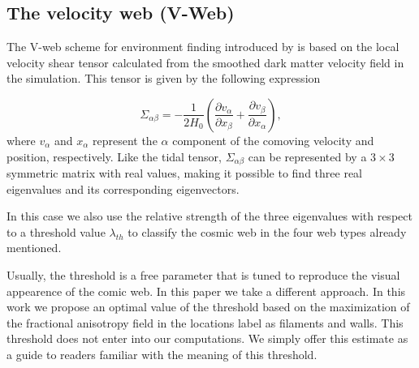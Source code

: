 \documentclass[a4,useAMS,usenatbib,usegraphicx]{mn2e}
\newcommand{\pr}[1]{ \left( #1 \right) }
\newcommand{\eq}[2]{\begin{equation} \label{eq:#1} #2 \end{equation}}
\begin{document}
\subsection{The velocity web (V-Web)}
\label{subsec:Vweb}

The V-web scheme for environment finding introduced by
\cite{Hoffman12} is based on the local velocity shear tensor
calculated from the smoothed dark matter  velocity field in the
simulation. 
This tensor is given by the  following expression

\eq{V_web}
{	\Sigma_{\alpha\beta} = -\frac{1}{2H_0}\pr{\frac{\partial v_{\alpha}}
{\partial x_{\beta}}+\frac{\partial v_{\beta}}{\partial x_{\alpha}}},}
where $v_{\alpha}$ and $x_{\alpha}$ represent the $\alpha$ component of 
the comoving velocity and position, respectively. Like the tidal tensor, 
$\Sigma_{\alpha\beta}$ can be represented by a $3\times 3$ symmetric 
matrix with real values, making it possible to find three real
eigenvalues and its corresponding eigenvectors.


In this case we also use the relative strength of the three eigenvalues with 
respect to a threshold value $\lambda_{th}$ to classify the cosmic web
in the four web types already mentioned.


Usually, the threshold is a free parameter that is tuned to reproduce
the visual appearence of the comic web. 
In this paper we take a different approach.
In this work we propose an optimal value of the threshold based on the
maximization of the fractional anisotropy field in the locations label
as filaments and walls. 
This threshold does not enter into our computations. 
We simply offer this estimate as a guide to readers familiar with the
meaning of this threshold.
\end{document}
